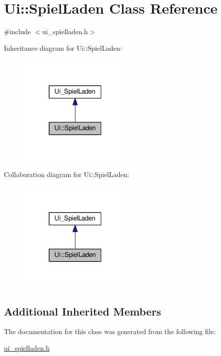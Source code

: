 \hypertarget{classUi_1_1SpielLaden}{\section{Ui\-:\-:Spiel\-Laden Class Reference}
\label{classUi_1_1SpielLaden}
}


{\ttfamily \#include $<$ui\-\_\-spielladen.\-h$>$}



Inheritance diagram for Ui\-:\-:Spiel\-Laden\-:\nopagebreak
\begin{figure}[H]
\begin{center}
\leavevmode
\includegraphics[width=160pt]{classUi_1_1SpielLaden__inherit__graph}
\end{center}
\end{figure}


Collaboration diagram for Ui\-:\-:Spiel\-Laden\-:\nopagebreak
\begin{figure}[H]
\begin{center}
\leavevmode
\includegraphics[width=160pt]{classUi_1_1SpielLaden__coll__graph}
\end{center}
\end{figure}
\subsection*{Additional Inherited Members}


The documentation for this class was generated from the following file\-:\begin{DoxyCompactItemize}
\item 
\hyperlink{ui__spielladen_8h}{ui\-\_\-spielladen.\-h}\end{DoxyCompactItemize}
